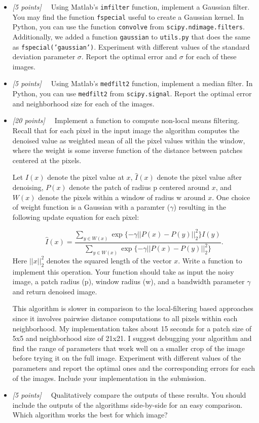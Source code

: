 \documentclass[10pt,letterpaper]{article}
\newcommand{\cmd}[1] {{\color{blue}\texttt{#1}}}
\newcommand{\points}[1]{{\color{mygreen}\emph{[#1]\ \ }}}
\begin{document}
\begin{itemize}
  \item \points{5 points} Using Matlab's \cmd{imfilter} function, implement a Gaussian filter. You may find the function \cmd{fspecial} useful to create a Gaussian kernel. In Python, you can use the function \cmd{convolve} from \cmd{scipy.ndimage.filters}. Additionally, we added a function \cmd{gaussian} to \cmd{utils.py} that does the same as \cmd{fspecial('gaussian')}. Experiment with different values of the standard deviation parameter $\sigma$. Report the optimal error and $\sigma$ for each of these images.
  \item \points{5 points} Using Matlab's \cmd{medfilt2} function, implement a median filter. In Python, you can use \cmd{medfilt2} from \cmd{scipy.signal}. Report the optimal error and neighborhood size for each of the images.
\item \points{20 points} Implement a function to compute non-local means filtering. Recall that for each pixel in the input image the algorithm computes the denoised value as weighted mean of all the pixel values within the window, where the weight is some inverse function of the distance between patches centered at the pixels.

Let $I(x)$ denote the pixel value at $x$, $\hat{I}(x)$ denote the pixel value after denoising, $P(x)$ denote the patch of radius p centered around $x$, and $W(x)$ denote the pixels within a window of radius w around $x$. One choice of weight function is a Gaussian with a paramter ($\gamma$) resulting in the following update equation for each pixel:


\begin{equation}
\hat{I}(x) = \frac{\sum_{y \in W(x)}\exp\{-\gamma||P(x) - P(y)||^2_2\}I(y)}
{\sum_{y \in W(x)} \exp\{-\gamma||P(x) - P(y)||^2_2\}}.
\end{equation}
Here $||x||^2_2$ denotes the squared length of the vector $x$. Write a function to implement this operation. Your function should take as input the noisy image, a patch radius (p), window radius (w), and a bandwidth parameter $\gamma$ and return denoised image.

This algorithm is slower in comparison to the local-filtering based approaches since it involves pairwise distance computations to all pixels within each neighborhood. My implementation takes about 15 seconds for a patch size of 5x5 and neighborhood size of 21x21.
I suggest debugging your algorithm and find the range of parameters that work well on a smaller crop of the image before trying it on the full image. 
Experiment with different values of the parameters and report the optimal ones and the corresponding errors for each of the images. Include your implementation in the submission.

\item \points{5 points} Qualitatively compare the outputs of these results. You should include the outputs of the algorithms side-by-side for an easy comparison. Which algorithm works the best for which image? 
\end{itemize}
\end{document}
